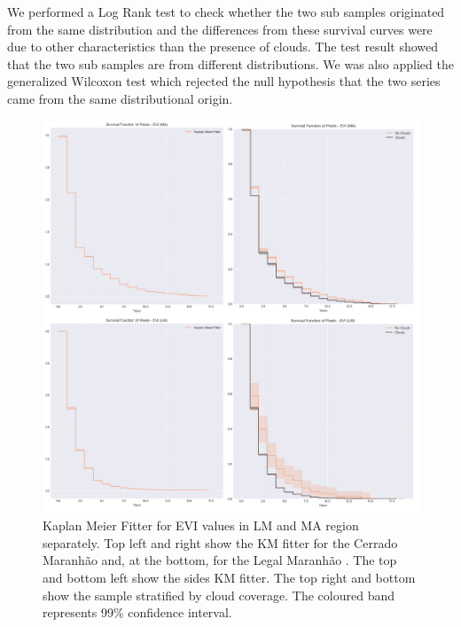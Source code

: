 We performed a Log Rank test \citep{Peto_1972} to check whether the two sub samples originated from the same distribution and the differences from these survival curves were due to other characteristics than the presence of clouds. The test result showed that the two sub samples are from different distributions. We was also applied the generalized Wilcoxon test \citep{lee_wang_2003} which rejected the null hypothesis that the two series came from the same distributional origin. 

\begin{figure}[H]
  \centering
  \includegraphics[width=1\textwidth]{KM_EVI.png}
\caption[Kaplan Meier Fitter for EVI values in LM and MA region separately.]{Kaplan Meier Fitter for EVI values in LM and MA region separately. Top left and right show the KM fitter for the Cerrado Maranhão  and, at the bottom, for the Legal Maranhão . The top and bottom left show the sides KM fitter. The top right and bottom show the sample stratified by cloud coverage. The coloured band represents 99\% confidence interval.}
\label{fig:km-evi}
\end{figure}

